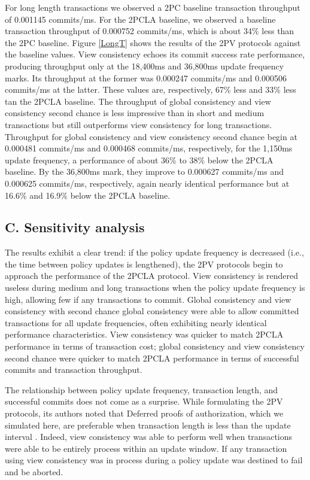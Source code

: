 \documentclass[11pt]{article}
\begin{document}
For long length transactions we observed a 2PC baseline transaction throughput of 0.001145 commits/ms. For the 2PCLA baseline, we observed a baseline transaction throughput of 0.000752 commits/ms, which is about 34\% less than the 2PC baseline. Figure \ref{LongT} shows the results of the 2PV protocols against the baseline values. View consistency echoes its commit success rate performance, producing throughput only at the 18,400ms and 36,800ms update frequency marks. Its throughput at the former was 0.000247 commits/ms and 0.000506 commits/ms at the latter. These values are, respectively, 67\% less and 33\% less tan the 2PCLA baseline. The throughput of global consistency and view consistency second chance is less impressive than in short and medium transactions but still outperforms view consistency for long transactions. Throughput for global consistency and view consistency second chance begin at 0.000481 commits/ms and 0.000468 commits/ms, respectively, for the 1,150ms update frequency, a performance of about 36\% to 38\% below the 2PCLA baseline. By the 36,800ms mark, they improve to 0.000627 commits/ms and 0.000625 commits/ms, respectively, again nearly identical performance but at 16.6\% and 16.9\% below the 2PCLA baseline.
\subsection{C. Sensitivity analysis}
The results exhibit a clear trend: if the policy update frequency is decreased (i.e., the time between policy updates is lengthened), the 2PV protocols begin to approach the performance of the 2PCLA protocol. View consistency is rendered useless during medium and long transactions when the policy update frequency is high, allowing few if any transactions to commit. Global consistency and view consistency with second chance global consistency were able to allow committed transactions for all update frequencies, often exhibiting nearly identical performance characteristics. View consistency was quicker to match 2PCLA performance in terms of transaction cost; global consistency and view consistency second chance were quicker to match 2PCLA performance in terms of successful commits and transaction throughput.

The relationship between policy update frequency, transaction length, and successful commits does not come as a surprise. While formulating the 2PV protocols, its authors noted that Deferred proofs of authorization, which we simulated here, are preferable when transaction length is less than the update interval \cite{Iskander}. Indeed, view consistency was able to perform well when transactions were able to be entirely process within an update window. If any transaction using view consistency was in process during a policy update was destined to fail and be aborted.
\end{document}
